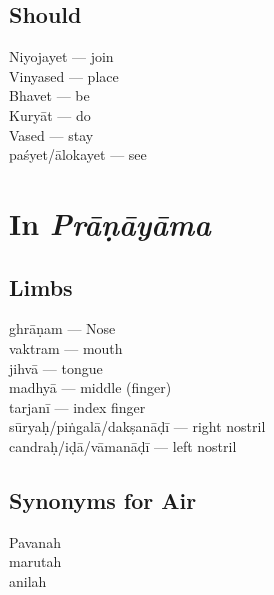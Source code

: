 \subsection*{Should}
\vspace{-10pt}

\begin{multicols}{2}
Niyojayet --- join\\
Vinyased --- place\\
Bhavet --- be\\
Kuryāt --- do \\
Vased --- stay \\
paśyet/ālokayet --- see 
\end{multicols}
\vspace{-10pt}

\section*{In  \textit{Prāṇāyāma}}
\vspace{-5pt}

\subsection*{Limbs}
\vspace{-10pt}

\begin{multicols}{2}
ghrāṇam --- Nose\\
vaktram --- mouth\\
jihvā --- tongue\\
madhyā --- middle (finger)\\
tarjanī --- index finger\\
sūryaḥ/piṅgalā/dakṣanāḍī --- right nostril\\
candraḥ/iḍā/vāmanāḍī --- left nostril
\end{multicols}
\vspace{-10pt}

\subsection*{Synonyms for Air}
\vspace{-10pt}

\begin{multicols}{2}
Pavanah\\
marutah\\
anilah
\end{multicols}
\vspace{-10pt}

